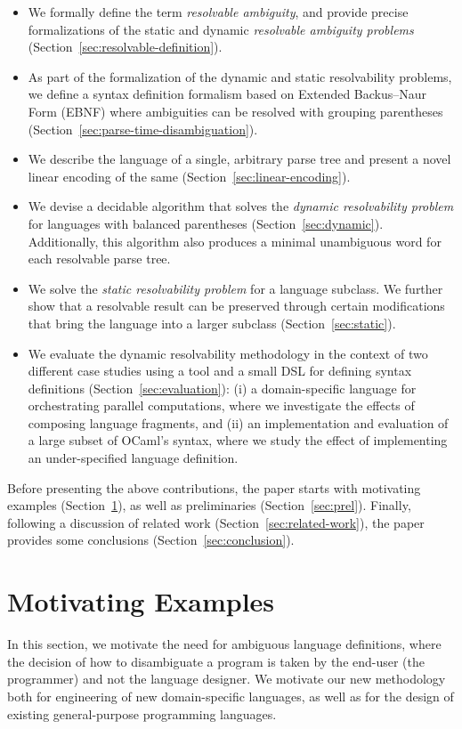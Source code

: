 \documentclass[runningheads]{llncs}
\begin{document}
\begin{itemize}
\item We formally define the term \emph{resolvable ambiguity}, and
  provide precise formalizations of the static and dynamic
  \emph{resolvable ambiguity problems}
  (Section~\ref{sec:resolvable-definition}).
\item As part of the formalization of the dynamic and static resolvability problems, we define a syntax definition formalism based on Extended Backus–Naur Form (EBNF) where ambiguities can be resolved with grouping parentheses (Section~\ref{sec:parse-time-disambiguation}).
\item We describe the language of a single, arbitrary parse tree and present a novel linear encoding of the same (Section~\ref{sec:linear-encoding}).
\item We devise a decidable algorithm that solves the \emph{dynamic resolvability problem} for languages with balanced parentheses (Section~\ref{sec:dynamic}). Additionally, this algorithm also produces a minimal unambiguous word for each resolvable parse tree.
\item We solve the \emph{static resolvability problem} for a language subclass. We further show that a resolvable result can be preserved through certain modifications that bring the language into a larger subclass (Section~\ref{sec:static}).
\item We evaluate the dynamic resolvability methodology in the context of two
  different case studies using a tool and a small DSL for defining
  syntax definitions (Section~\ref{sec:evaluation}): (i) a
  domain-specific language for orchestrating parallel
  computations, where we investigate the effects of composing
  language fragments, and (ii) an implementation and evaluation of
  a large subset of OCaml's syntax, where we study the effect of
  implementing an under-specified language definition.
\end{itemize}

\noindent Before presenting the above contributions, the paper starts with motivating examples (Section~\ref{sec:motivation}), as well as preliminaries (Section~\ref{sec:prel}). Finally, following a discussion of related work (Section~\ref{sec:related-work}), the paper provides some conclusions (Section~\ref{sec:conclusion}).




\section{Motivating Examples}
\label{sec:motivation}
In this section, we motivate the need for ambiguous language definitions, where the decision of how to disambiguate a program is taken by the end-user (the programmer) and not the language designer. We motivate our new methodology both for engineering of new domain-specific languages, as well as for the design of existing general-purpose programming languages.
\end{document}
